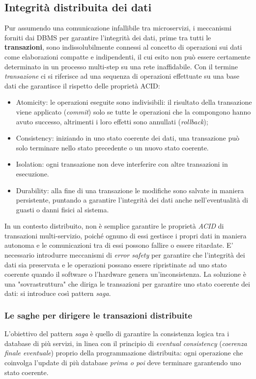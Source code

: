 \subsection{Integrità distribuita dei dati}
Pur assumendo una comunicazione infallibile tra microservizi, i meccanismi forniti dai DBMS per garantire l'integrità dei dati, prime tra tutti le \textbf{transazioni}, sono indissolubilmente connessi al concetto di operazioni sui dati come elaborazioni compatte e indipendenti, il cui esito non può essere certamente determinato in un processo multi-step su una rete inaffidabile.
Con il termine \emph{transazione} ci si riferisce ad una sequenza di operazioni effettuate su una base dati che garantisce il rispetto delle proprietà ACID:
\begin{itemize}
  \item Atomicity: le operazioni eseguite sono indivisibili: il risultato della transazione viene applicato (\emph{commit}) solo se tutte le operazioni che la compongono hanno avuto successo, altrimenti i loro effetti sono annullati (\emph{rollback});
  \item Consistency: iniziando in uno stato coerente dei dati, una transazione può solo terminare nello stato precedente o un nuovo stato coerente.
  \item Isolation: ogni transazione non deve interferire con altre transazioni in esecuzione.
  \item Durability: alla fine di una transazione le modifiche sono salvate in maniera persistente, puntando a garantire l'integrità dei dati anche nell'eventualità di guasti o danni fisici al sistema.
\end{itemize}

In un contesto distribuito, non è semplice garantire le proprietà \emph{ACID} di transazioni multi-servizio, poiché ognuno di essi gestisce i propri dati in maniera autonoma e le comunicazioni tra di essi possono fallire o essere ritardate. E' necessario introdurre meccanismi di \emph{error safety} per garantire che l'integrità dei dati sia preservata e le operazioni possano essere ripristinate ad uno stato coerente quando il software o l'hardware genera un'inconsistenza.
La soluzione è una "sovrastruttura" che diriga le transazioni per garantire uno stato coerente dei dati: si introduce così pattern \emph{saga}.

\subsubsection{Le saghe per dirigere le transazioni distribuite}
L'obiettivo del pattern \emph{saga} è quello di garantire la consistenza logica tra i database di più servizi, in linea con il principio di \emph{eventual consistency} (\emph{coerenza finale eventuale}) proprio della programmazione distribuita: ogni operazione che coinvolga l'update di più database \emph{prima o poi} deve terminare garantendo uno stato coerente.

